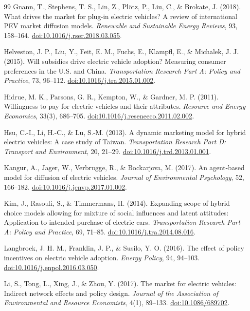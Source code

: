\documentclass[11pt]{article}
\begin{document}
\begin{thebibliography}{99}
Gnann, T., Stephens, T. S., Lin, Z., Pl\"{o}tz, P., Liu, C., \& Brokate, J. (2018).
What drives the market for plug-in electric vehicles? A review of international
PEV market diffusion models.
\emph{Renewable and Sustainable Energy Reviews}, 93, 158--164.
\href{https://doi.org/10.1016/j.rser.2018.03.055}{doi:10.1016/j.rser.2018.03.055}.

Helveston, J. P., Liu, Y., Feit, E. M., Fuchs, E., Klampfl, E., \& Michalek, J. J. (2015).
Will subsidies drive electric vehicle adoption? Measuring consumer preferences
in the U.S. and China.
\emph{Transportation Research Part A: Policy and Practice}, 73, 96--112.
\href{https://doi.org/10.1016/j.tra.2015.01.002}{doi:10.1016/j.tra.2015.01.002}.

Hidrue, M. K., Parsons, G. R., Kempton, W., \& Gardner, M. P. (2011).
Willingness to pay for electric vehicles and their attributes.
\emph{Resource and Energy Economics}, 33(3), 686--705.
\href{https://doi.org/10.1016/j.reseneeco.2011.02.002}{doi:10.1016/j.reseneeco.2011.02.002}.

Hsu, C.-I., Li, H.-C., \& Lu, S.-M. (2013).
A dynamic marketing model for hybrid electric vehicles: A case study of Taiwan.
\emph{Transportation Research Part D: Transport and Environment}, 20, 21--29.
\href{https://doi.org/10.1016/j.trd.2013.01.001}{doi:10.1016/j.trd.2013.01.001}.

Kangur, A., Jager, W., Verbrugge, R., \& Bockarjova, M. (2017).
An agent-based model for diffusion of electric vehicles.
\emph{Journal of Environmental Psychology}, 52, 166--182.
\href{https://doi.org/10.1016/j.jenvp.2017.01.002}{doi:10.1016/j.jenvp.2017.01.002}.

Kim, J., Rasouli, S., \& Timmermans, H. (2014).
Expanding scope of hybrid choice models allowing for mixture of social
influences and latent attitudes: Application to intended purchase of electric
cars.
\emph{Transportation Research Part A: Policy and Practice}, 69, 71--85.
\href{https://doi.org/10.1016/j.tra.2014.08.016}{doi:10.1016/j.tra.2014.08.016}.

Langbroek, J. H. M., Franklin, J. P., \& Susilo, Y. O. (2016).
The effect of policy incentives on electric vehicle adoption.
\emph{Energy Policy}, 94, 94--103.
\href{https://doi.org/10.1016/j.enpol.2016.03.050}{doi:10.1016/j.enpol.2016.03.050}.

Li, S., Tong, L., Xing, J., \& Zhou, Y. (2017).
The market for electric vehicles: Indirect network effects and policy design.
\emph{Journal of the Association of Environmental and Resource Economists},
4(1), 89--133.
\href{https://doi.org/10.1086/689702}{doi:10.1086/689702}.


\end{thebibliography}
\end{document}
